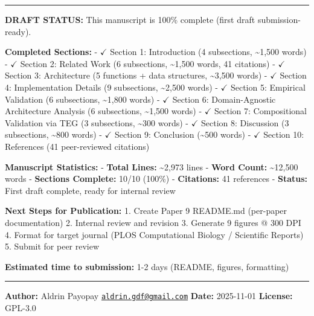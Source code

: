 \documentclass[
]{article}
\begin{document}
\begin{center}\rule{0.5\linewidth}{0.5pt}\end{center}

\textbf{DRAFT STATUS:} This manuscript is 100\% complete (first draft
submission-ready).

\textbf{Completed Sections:} - $\checkmark$ Section 1: Introduction (4
subsections, \textasciitilde1,500 words) - $\checkmark$ Section 2: Related Work (6
subsections, \textasciitilde1,500 words, 41 citations) - $\checkmark$ Section 3:
Architecture (5 functions + data structures, \textasciitilde3,500 words)
- $\checkmark$ Section 4: Implementation Details (9 subsections,
\textasciitilde2,500 words) - $\checkmark$ Section 5: Empirical Validation (6
subsections, \textasciitilde1,800 words) - $\checkmark$ Section 6: Domain-Agnostic
Architecture Analysis (6 subsections, \textasciitilde1,500 words) - $\checkmark$
Section 7: Compositional Validation via TEG (3 subsections,
\textasciitilde300 words) - $\checkmark$ Section 8: Discussion (3 subsections,
\textasciitilde800 words) - $\checkmark$ Section 9: Conclusion (\textasciitilde500
words) - $\checkmark$ Section 10: References (41 peer-reviewed citations)

\textbf{Manuscript Statistics:} - \textbf{Total Lines:}
\textasciitilde2,973 lines - \textbf{Word Count:} \textasciitilde12,500
words - \textbf{Sections Complete:} 10/10 (100\%) - \textbf{Citations:}
41 references - \textbf{Status:} First draft complete, ready for
internal review

\textbf{Next Steps for Publication:} 1. Create Paper 9 README.md
(per-paper documentation) 2. Internal review and revision 3. Generate 9
figures @ 300 DPI 4. Format for target journal (PLOS Computational
Biology / Scientific Reports) 5. Submit for peer review

\textbf{Estimated time to submission:} 1-2 days (README, figures,
formatting)

\begin{center}\rule{0.5\linewidth}{0.5pt}\end{center}

\textbf{Author:} Aldrin Payopay
\href{mailto:aldrin.gdf@gmail.com}{\nolinkurl{aldrin.gdf@gmail.com}}
\textbf{Date:} 2025-11-01 \textbf{License:} GPL-3.0
\end{document}
